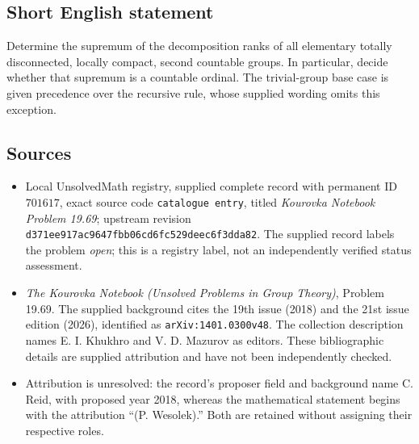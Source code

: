 \documentclass[11pt]{article}
\begin{document}
\subsection{Short English statement}
Determine the supremum of the decomposition ranks of all elementary totally disconnected, locally compact, second countable groups. In particular, decide whether that supremum is a countable ordinal. The trivial-group base case is given precedence over the recursive rule, whose supplied wording omits this exception.
\subsection{Sources}
\begin{itemize}
\item Local UnsolvedMath registry, supplied complete record with permanent ID \(701617\), exact source code \texttt{catalogue entry}, titled \emph{Kourovka Notebook Problem 19.69}; upstream revision \texttt{d371ee917ac9647fbb06cd6fc529deec6f3dda82}. The supplied record labels the problem \emph{open}; this is a registry label, not an independently verified status assessment.
\item \emph{The Kourovka Notebook (Unsolved Problems in Group Theory)}, Problem 19.69. The supplied background cites the 19th issue (2018) and the 21st issue edition (2026), identified as \texttt{arXiv:1401.0300v48}. The collection description names E. I. Khukhro and V. D. Mazurov as editors. These bibliographic details are supplied attribution and have not been independently checked.
\item Attribution is unresolved: the record's proposer field and background name C. Reid, with proposed year 2018, whereas the mathematical statement begins with the attribution ``(P. Wesolek).'' Both are retained without assigning their respective roles.
\end{itemize}
\end{document}
